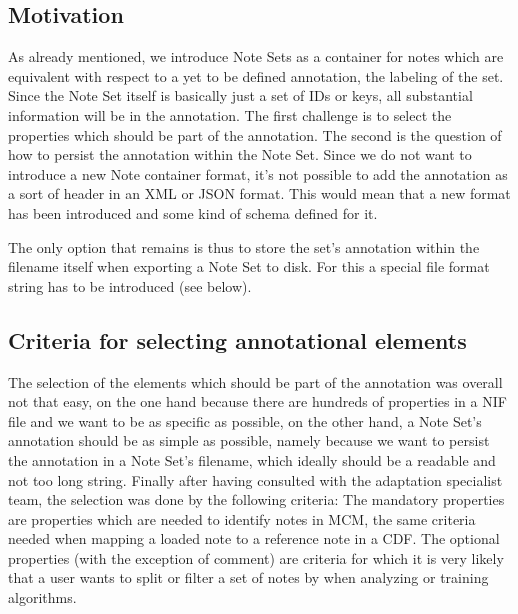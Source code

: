 \subsection{Motivation}
As already mentioned, we introduce Note Sets as a container for notes which are equivalent with respect to a yet to be defined annotation, the labeling of the set. Since the Note Set itself is basically just a set of IDs or keys, all substantial information will be in the annotation. The first challenge is to select the properties which should be part of the annotation. The second is the question of how to persist the annotation within the Note Set. Since we do not want to introduce a new Note container format, it's not possible to add the annotation as a sort of header in an XML or JSON format. This would mean that a new format has been introduced and some kind of schema defined for it. \par
The only option that remains is thus to store the set's annotation within the filename itself when exporting a Note Set to disk. For this a special file format string has to be introduced (see below).
\subsection{Criteria for selecting annotational elements}
The selection of the elements which should be part of the annotation was overall not that easy, on the one hand because there are hundreds of properties in a NIF file and we want to be as specific as possible, on the other hand, a Note Set's annotation should be as simple as possible, namely because we want to persist the annotation in a Note Set's filename, which ideally should be a readable and not too long string.
Finally after having consulted with the adaptation specialist team, the selection was done by the following criteria: The mandatory properties are properties which are needed to identify notes in MCM, the same criteria needed when mapping a loaded note to a reference note in a CDF. The optional properties (with the exception of comment) are criteria for which it is very likely that a user wants to split or filter a set of notes by when analyzing or training algorithms.
